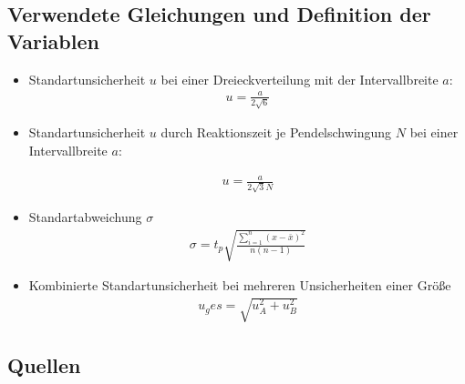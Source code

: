 
\subsection{Verwendete Gleichungen und Definition der Variablen}\label{VGuD}
\begin{itemize}
\item Standartunsicherheit $u$ bei einer Dreieckverteilung mit der Intervallbreite $a$:
\begin{align}
	u=\frac{a}{2\sqrt{6}} \label{su3}
\end{align} 

\item Standartunsicherheit $u$ durch Reaktionszeit je Pendelschwingung $N$ bei einer Intervallbreite $a$:

\begin{align}
	u=\frac{a}{2\sqrt{3}N} \label{sur}
\end{align} 


\item Standartabweichung $\sigma$
\begin{align}
\sigma=t_p \sqrt{\frac{\sum_{i=1}^{n}(x-\bar{x})^2}{n(n-1)}}
\label{sigma}
\end{align}

\item Kombinierte Standartunsicherheit bei mehreren Unsicherheiten einer Größe
\begin{align}
u_ges=\sqrt{u_A^2+u_B^2}
\label{kombsu}
\end{align}

\end{itemize}


\subsection{Quellen}
